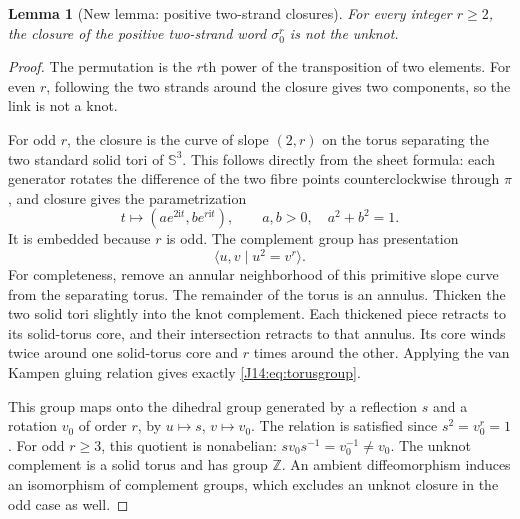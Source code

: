 \documentclass[11pt,oneside]{report}
\newtheorem{lemma}[theorem]{Lemma}
\theoremstyle{definition}
\numberwithin{equation}{section}
\newcommand{\ii}{\mathrm i}
\begin{document}
\begin{lemma}[New lemma: positive two-strand closures]
\label{J14:lem:two}
For every integer $r\geq2$, the closure of the positive two-strand word
$\sigma_0^r$ is not the unknot.
\end{lemma}
\begin{proof}
The permutation is the $r$th power of the transposition of two elements.
For even $r$, following the two strands around the closure gives two
components, so the link is not a knot.

For odd $r$, the closure is the curve of slope $(2,r)$ on the torus separating
the two standard solid tori of $\mathbb S^3$. This follows directly from the
sheet formula: each generator rotates the difference of the two fibre
points counterclockwise through $\pi$, and closure gives the parametrization
\[
 t\longmapsto (a e^{2\ii t},b e^{r\ii t}),\qquad
 a,b>0,\quad a^2+b^2=1.
\]
It is embedded because $r$ is odd. The complement group has presentation
\begin{equation}\label{J14:eq:torusgroup}
 \langle u,v\mid u^2=v^r\rangle.
\end{equation}
For completeness, remove an annular neighborhood of this primitive slope
curve from the separating torus. The remainder of the torus is an annulus.
Thicken the two solid tori slightly into the knot complement. Each thickened
piece retracts to its solid-torus core, and their intersection retracts to
that annulus. Its core winds twice around one solid-torus core and $r$ times
around the other. Applying the van Kampen gluing relation gives exactly
\eqref{J14:eq:torusgroup}.

This group maps onto the dihedral group generated by a reflection $s$ and a
rotation $v_0$ of order $r$, by $u\mapsto s$, $v\mapsto v_0$.
The relation is satisfied since $s^2=v_0^r=1$. For odd $r\geq3$, this quotient
is nonabelian: $sv_0s^{-1}=v_0^{-1}\ne v_0$.
The unknot complement is a solid torus and has group $\mathbb Z$.
An ambient diffeomorphism induces an isomorphism of complement groups, which
excludes an unknot closure in the odd case as well.
\end{proof}
\end{document}
